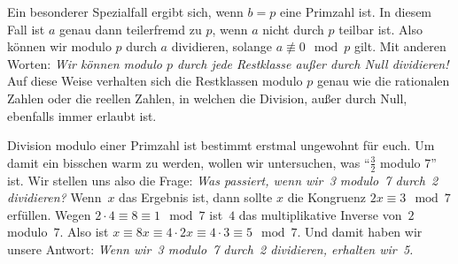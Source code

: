 Ein besonderer Spezialfall ergibt sich, wenn $b=p$ eine Primzahl ist. In diesem Fall ist $a$ genau dann teilerfremd zu $p$, wenn $a$ nicht durch $p$ teilbar ist. Also können wir modulo $p$ durch $a$ dividieren, solange $a\not\equiv 0\mod p$ gilt. Mit anderen Worten: \emph{Wir können modulo $p$ durch jede Restklasse außer durch Null dividieren!} Auf diese Weise verhalten sich die Restklassen modulo $p$ genau wie die rationalen Zahlen oder die reellen Zahlen, in welchen die Division, außer durch Null, ebenfalls immer erlaubt ist.

Division modulo einer Primzahl ist bestimmt erstmal ungewohnt für euch. Um damit ein bisschen warm zu werden, wollen wir untersuchen, was \enquote{$\frac 32$ modulo 7} ist. Wir stellen uns also die Frage: \emph{Was passiert, wenn wir~3 modulo~7 durch~2 dividieren?} Wenn~$x$ das Ergebnis ist, dann sollte $x$ die Kongruenz $2x\equiv 3\mod 7$ erfüllen. Wegen $2\cdot 4\equiv 8\equiv 1\mod 7$ ist~$4$ das multiplikative Inverse von~$2$ modulo~$7$. Also ist $x\equiv 8x\equiv 4\cdot 2x\equiv 4\cdot 3\equiv 5\mod 7$. Und damit haben wir unsere Antwort: \emph{Wenn wir~3 modulo~7 durch~2 dividieren, erhalten wir~5.}


